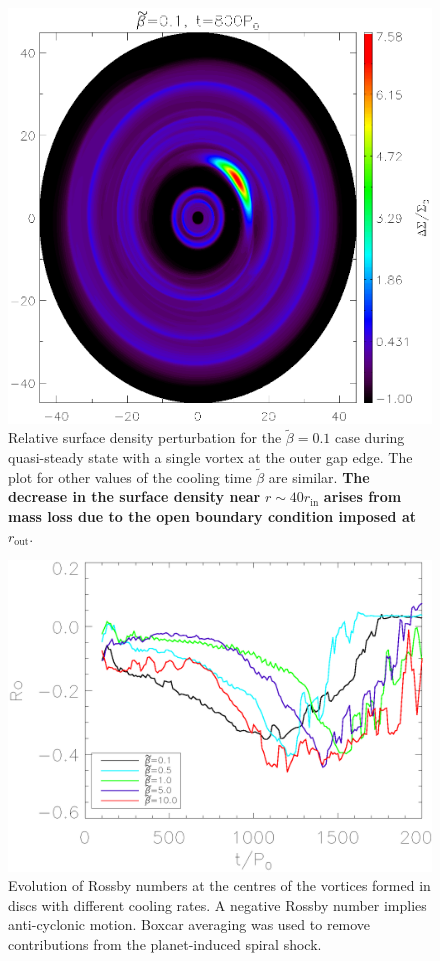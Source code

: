 \begin{figure}
  \includegraphics[width=\linewidth,height=\linewidth]{figures/vortex2D}
  \caption{Relative surface density perturbation for the
    $\tilde\beta=0.1$ case during quasi-steady state with a single
    vortex at the outer gap edge. The plot for other values of the cooling time
    $\tilde{\beta}$ are similar. {\bf The decrease in the surface
      density near} $r\sim 40 r_\mathrm{in}$ {\bf arises from mass loss due to the open
      boundary condition imposed at} $r_\mathrm{out}$.
    \label{Vortex2D} }
\end{figure}



\begin{figure}
  \includegraphics[width=\linewidth,clip=true,trim=0.5cm
  0cm 0cm 1cm]{figures/rossby}
  \caption{Evolution of Rossby numbers at the centres of the vortices
    formed in discs with different cooling rates. A negative Rossby
    number implies anti-cyclonic motion. Boxcar averaging
    was used to remove contributions from the planet-induced spiral shock.\label{rossbyplot}}    
\end{figure}

